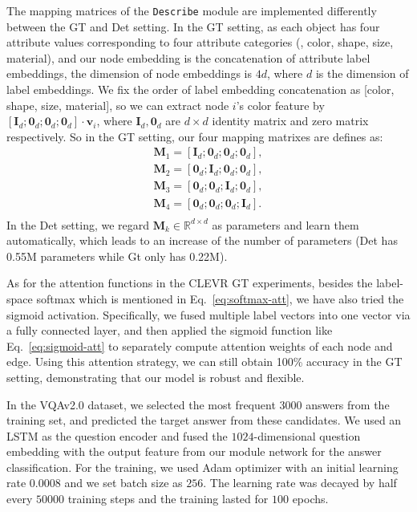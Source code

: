 \documentclass[10pt,twocolumn,letterpaper]{article}
\begin{document}
The mapping matrices of the \texttt{Describe} module are implemented differently between the GT and Det setting.
In the GT setting, as each object has four attribute values corresponding to four attribute categories (\ie, color, shape, size, material), and our node embedding is the concatenation of attribute label embeddings, the dimension of node embeddings is $4d$, where $d$ is the dimension of label embeddings.
We fix the order of label embedding concatenation as [color, shape, size, material], so we can extract node $i$'s color feature by $[\mathbf{I}_d; \mathbf{0}_d; \mathbf{0}_d; \mathbf{0}_d] \cdot \mathbf{v}_i$, where $\mathbf{I}_d, \mathbf{0}_d$ are $d \times d$ identity matrix and zero matrix respectively.
So in the GT setting, our four mapping matrixes are defines as:
\begin{equation}
\begin{aligned}
    \mathbf{M}_1 = [\mathbf{I}_d; \mathbf{0}_d; \mathbf{0}_d; \mathbf{0}_d],\\
    \mathbf{M}_2 = [\mathbf{0}_d; \mathbf{I}_d; \mathbf{0}_d; \mathbf{0}_d],\\
    \mathbf{M}_3 = [\mathbf{0}_d; \mathbf{0}_d; \mathbf{I}_d; \mathbf{0}_d],\\
    \mathbf{M}_4 = [\mathbf{0}_d; \mathbf{0}_d; \mathbf{0}_d; \mathbf{I}_d].\\
\end{aligned}
\end{equation}
In the Det setting, we regard $\mathbf{M}_k \in \mathbb{R}^{d \times d}$ as parameters and learn them automatically, which leads to an increase of the number of parameters (Det has 0.55M parameters while Gt only has 0.22M).

As for the attention functions in the CLEVR GT experiments, besides the label-space softmax which is mentioned in Eq.~\ref{eq:softmax-att}, we have also tried the sigmoid activation. Specifically, we fused multiple label vectors into one vector via a fully connected layer, and then applied the sigmoid function like Eq.~\ref{eq:sigmoid-att} to separately compute attention weights of each node and edge. Using this attention strategy, we can still obtain 100\% accuracy in the GT setting, demonstrating that our model is robust and flexible.

In the VQAv2.0 dataset, we selected the most frequent 3000 answers from the training set, and predicted the target answer from these candidates.
We used an LSTM as the question encoder and fused the $1024$-dimensional question embedding with the output feature from our module network for the answer classification.
For the training, we used Adam optimizer with an initial learning rate $0.0008$ and we set batch size as $256$.
The learning rate was decayed by half every $50000$ training steps and the training lasted for $100$ epochs.
\end{document}
